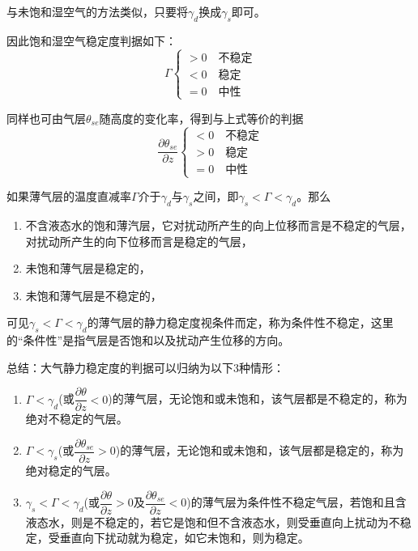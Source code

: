 \documentclass[UTF8,a4paper,11pt,oneside]{ctexbook}
\begin{document}
与未饱和湿空气的方法类似，只要将\(\gamma_d\)换成\(\gamma_s\)即可。

因此饱和湿空气稳定度判据如下：
\begin{equation}
\Gamma\begin{cases}
    >0\quad\text{不稳定}\\
    <0\quad\text{稳定}\\
    =0\quad\text{中性}
\end{cases}
\end{equation}

同样也可由气层\(\theta{}_{se}\)随高度的变化率，得到与上式等价的判据
\begin{equation}
\dfrac{\partial{}\theta{}_{se}}{\partial{}z}\begin{cases}
    <0\quad\text{不稳定}\\
    >0\quad\text{稳定}\\
    =0\quad\text{中性}
\end{cases}
\end{equation}

如果薄气层的温度直减率\(\Gamma\)介于\(\gamma_d\)与\(\gamma_s\)之间，即\(\gamma_s<\Gamma<\gamma_d\)。那么
\begin{enumerate}
    \item 不含液态水的饱和薄汽层，它对扰动所产生的向上位移而言是不稳定的气层，对扰动所产生的向下位移而言是稳定的气层，
    \item 未饱和薄气层是稳定的，
    \item 未饱和薄气层是不稳定的，
\end{enumerate}

可见\(\gamma_s<\Gamma<\gamma_d\)的薄气层的静力稳定度视条件而定，称为条件性不稳定，这里的“条件性”是指气层是否饱和以及扰动产生位移的方向。

总结：大气静力稳定度的判据可以归纳为以下3种情形：
\begin{enumerate}
    \item \(\Gamma<\gamma_d\)(或\(\dfrac{\partial{}\theta}{\partial{}z}<0\))的薄气层，无论饱和或未饱和，该气层都是不稳定的，称为绝对不稳定的气层。
    \item \(\Gamma<\gamma_s\)(或\(\dfrac{\partial{}\theta_{se}}{\partial{}z}>0\))的薄气层，无论饱和或未饱和，该气层都是稳定的，称为绝对稳定的气层。
    \item \(\gamma_s<\Gamma<\gamma_d\)(或\(\dfrac{\partial{}\theta}{\partial{}z}>0\text{及}\dfrac{\partial{}\theta_{se}}{\partial{}z}<0\))的薄气层为条件性不稳定气层，若饱和且含液态水，则是不稳定的，若它是饱和但不含液态水，则受垂直向上扰动为不稳定，受垂直向下扰动就为稳定，如它未饱和，则为稳定。
\end{enumerate}
\end{document}
